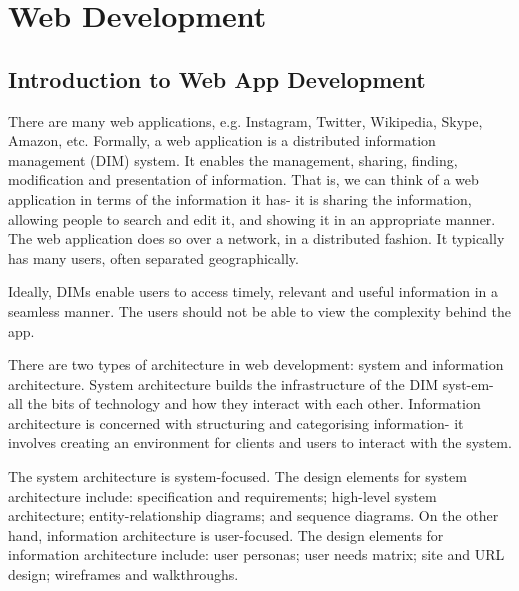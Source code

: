 \documentclass[a4paper, openany]{memoir}
\begin{document}
    \chapter{Web Development}

    \section{Introduction to Web App Development}
    There are many web applications, e.g. Instagram, Twitter, Wikipedia, Skype, Amazon, etc. Formally, a web application is a distributed information management (DIM) system. It enables the management, sharing, finding, modification and presentation of information. That is, we can think of a web application in terms of the information it has- it is sharing the information, allowing people to search and edit it, and showing it in an appropriate manner. The web application does so over a network, in a distributed fashion. It typically has many users, often separated geographically.

    \noindent Ideally, DIMs enable users to access timely, relevant and useful information in a seamless manner. The users should not be able to view the complexity behind the app.

    \noindent There are two types of architecture in web development: system and information architecture. System architecture builds the infrastructure of the DIM syst-em- all the bits of technology and how they interact with each other. Information architecture is concerned with structuring and categorising information- it involves creating an environment for clients and users to interact with the system.

    \noindent The system architecture is system-focused. The design elements for system architecture include: specification and requirements; high-level system architecture; entity-relationship diagrams; and sequence diagrams. On the other hand, information architecture is user-focused. The design elements for information architecture include: user personas; user needs matrix; site and URL design; wireframes and walkthroughs.
\end{document}
